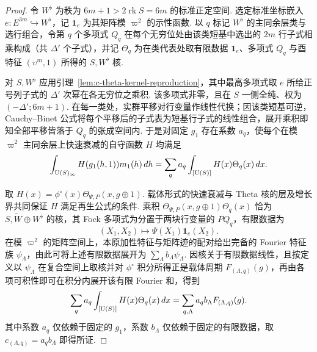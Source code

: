 \begin{proof}
令 $W^\flat$ 为秩为 $6m+1>2\operatorname{rk}S=6m$ 的标准正定空间. 选定标准坐标嵌入 $e:E^{3m}\hookrightarrow W^\flat$，记 $\mathbf 1_e$ 为其矩阵模 $\varpi^2$ 的示性函数. 以 $q$ 标记 $W^\flat$ 的主同余层类与选行组合，令第 $q$ 个多项式 $Q_q$ 在每个无穷位处由该类短基中选出的 $2m$ 行子式相乘构成（共 $\Delta'$ 个子式），并记 $\Theta_q$ 为在类代表处取有限数据 $\mathbf 1_e$、多项式 $Q_q$ 与酉特征 $(\upsilon^m,1)$ 所得的 $S,W^\flat$ 核.

对 $S,W^\flat$ 应用引理~\ref{lem:c-theta-kernel-reproduction}，其中最高多项式取 $e$ 所给正号列子式的 $\Delta'$ 次幂在各无穷位之乘积. 该多项式非零，且在 $S$ 一侧全纯、权为 $(-\Delta';6m+1)$. 在每一类处，实群平移对行变量作线性代换；因该类短基可逆，Cauchy--Binet 公式将每个平移后的子式表为短基行子式的线性组合，展开乘积即知全部平移皆落于 $Q_q$ 的张成空间内. 于是对固定 $g_1$ 存在系数 $a_q$，使每个在模 $\varpi^2$ 主同余层上快速衰减的自守函数 $H$ 均满足
\[
 \int_{\operatorname{U}(S)_\infty} H(g_1(h,1))m_1(h)\,dh
 =\sum_q a_q\int_{[\operatorname{U}(S)]}H(x)\Theta_q(x)\,dx .
\]

取 $H(x)=\phi^\circ(x)\Theta_{\Psi,P}(x,g\oplus1)$. 载体形式的快速衰减与 Theta 核的层及增长界共同保证 $H$ 满足再生公式的条件. 乘积 $\Theta_{\Psi,P}(x,g\oplus1)\Theta_q(x)$ 恰为 $S,\widetilde W\oplus W^\flat$ 的核，其 Fock 多项式为分置于两块行变量的 $P Q_q$，有限数据为
\[
 (X_1,X_2)\longmapsto\Psi(X_1)\mathbf 1_e(X_2).
\]
在模 $\varpi^2$ 的矩阵空间上，本原加性特征与矩阵迹的配对给出完备的 Fourier 特征族 $\psi_\Lambda$，由此可将上述有限数据展开为 $\sum_\Lambda b_\Lambda\psi_\Lambda$. 因核关于有限数据线性，且按定义以 $\psi_\Lambda$ 在复合空间上取核并对 $\phi^\circ$ 积分所得正是载体周期 $F_{(\Lambda,q)}(g)$，再由各项可积性即可在积分内展开该有限 Fourier 和，得到
\[
 \sum_q a_q\int_{[\operatorname{U}(S)]}H(x)\Theta_q(x)\,dx
 =\sum_{q,\Lambda} a_q b_\Lambda F_{(\Lambda,q)}(g).
\]
其中系数 $a_q$ 仅依赖于固定的 $g_1$，系数 $b_\Lambda$ 仅依赖于固定的有限数据，取 $c_{(\Lambda,q)}=a_qb_\Lambda$ 即得所证.
\end{proof}

